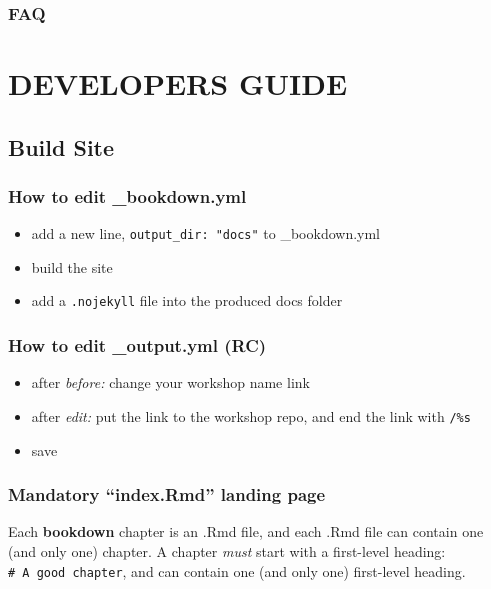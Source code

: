 \documentclass[
]{book}
\providecommand{\tightlist}{%
  \setlength{\itemsep}{0pt}\setlength{\parskip}{0pt}}
\theoremstyle{definition}
\theoremstyle{definition}
\theoremstyle{definition}
\theoremstyle{definition}
\theoremstyle{remark}
\begin{document}
\section{FAQ}\label{faq}

\part{DEVELOPERS GUIDE}\label{part-developers-guide}

\chapter{Build Site}\label{build-site}

\section{How to edit \_bookdown.yml}\label{how-to-edit-_bookdown.yml}

\begin{itemize}
\tightlist
\item
  add a new line, \texttt{output\_dir:\ "docs"} to \_bookdown.yml
\item
  build the site
\item
  add a \texttt{.nojekyll} file into the produced docs folder
\end{itemize}

\section{How to edit \_output.yml (RC)}\label{how-to-edit-_output.yml-rc}

\begin{itemize}
\tightlist
\item
  after \emph{before:} change your workshop name link
\item
  after \emph{edit:} put the link to the workshop repo, and end the link with \texttt{/\%s}
\item
  save
\end{itemize}

\section{Mandatory ``index.Rmd'' landing page}\label{mandatory-index.rmd-landing-page}

Each \textbf{bookdown} chapter is an .Rmd file, and each .Rmd file can contain one (and only one) chapter. A chapter \emph{must} start with a first-level heading: \texttt{\#\ A\ good\ chapter}, and can contain one (and only one) first-level heading.
\end{document}
